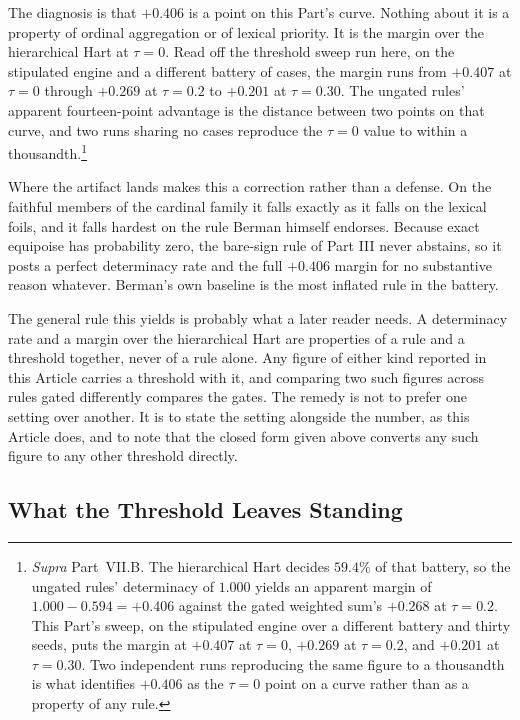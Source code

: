 The diagnosis is that $+0.406$ is a point on this Part's curve. Nothing
about it is a property of ordinal aggregation or of lexical priority. It
is the margin over the hierarchical Hart at $\tau = 0$. Read
off the threshold sweep run here, on the stipulated engine and a
different battery of cases, the margin runs from $+0.407$ at $\tau = 0$
through $+0.269$ at $\tau = 0.2$ to $+0.201$ at $\tau = 0.30$. The
ungated rules' apparent fourteen-point advantage is the distance between
two points on that curve, and two runs sharing no cases reproduce the
$\tau = 0$ value to within a thousandth.\footnote{\textit{Supra}
Part~VII.B. The hierarchical Hart decides $59.4\%$ of that battery, so
the ungated rules' determinacy of $1.000$ yields an apparent margin of
$1.000 - 0.594 = +0.406$ against the gated weighted sum's $+0.268$ at
$\tau = 0.2$. This Part's sweep, on the stipulated engine over a
different battery and thirty seeds, puts the margin at $+0.407$ at
$\tau = 0$, $+0.269$ at $\tau = 0.2$, and $+0.201$ at $\tau = 0.30$. Two
independent runs reproducing the same figure to a thousandth is what
identifies $+0.406$ as the $\tau = 0$ point on a curve rather than as a
property of any rule.}

Where the artifact lands makes this a correction rather than a defense. On the faithful members of the cardinal family it falls exactly as it falls
on the lexical foils, and it falls hardest on the rule Berman himself endorses.
Because exact equipoise has probability zero, the bare-sign rule of Part
III never abstains, so it posts a perfect determinacy rate and the full
$+0.406$ margin for no substantive reason whatever. Berman's
own baseline is the most inflated rule in the battery.

The general rule this yields is probably what a later reader needs. A determinacy
rate and a margin over the hierarchical Hart are properties of a rule and
a threshold together, never of a rule alone. Any figure of either kind
reported in this Article carries a threshold with it, and comparing two
such figures across rules gated differently compares the gates. The
remedy is not to prefer one setting over another. It is to state the
setting alongside the number, as this Article does, and to
note that the closed form given above converts any such figure to any other threshold
directly.

\subsection{What the Threshold Leaves Standing}

